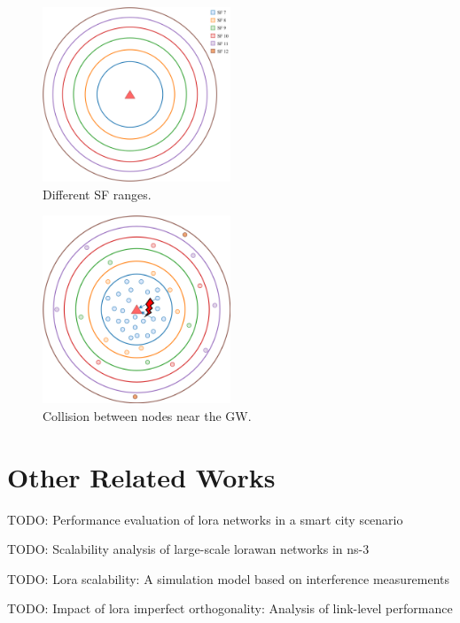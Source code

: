 \documentclass[conference]{IEEEtran}
\begin{document}
\begin{figure}
\centering
\includegraphics[width=0.5\textwidth]{lora0}
\caption{Different SF ranges.}
\label{fig:problem1}
\end{figure}

\begin{figure}
\centering
\includegraphics[width=0.5\textwidth]{lora1}
\caption{Collision between nodes near the GW.}
\label{fig:problem2}
\end{figure}


\section{Other Related Works}
\par TODO: Performance evaluation of lora networks in a smart city scenario\cite{7996384}

\par TODO: Scalability analysis of large-scale lorawan networks in ns-3 \cite{8090518}

\par TODO: Lora scalability: A simulation model based on interference measurements \cite{s17061193}

\par TODO: Impact of lora imperfect orthogonality: Analysis of link-level performance \cite{8267219}
\end{document}
